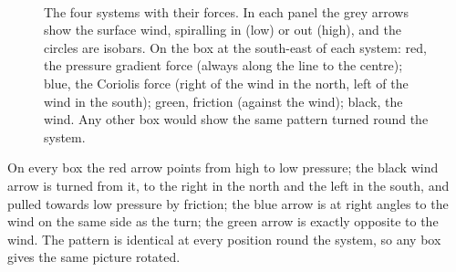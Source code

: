 \begin{figure}[ht]
\centering
\begin{minipage}{0.49\textwidth}\centering
{}
\end{minipage}
\begin{minipage}{0.49\textwidth}\centering
{}
\end{minipage}\\[6pt]
\begin{minipage}{0.49\textwidth}\centering
{}
\end{minipage}
\begin{minipage}{0.49\textwidth}\centering
{}
\end{minipage}
\caption{The four systems with their forces. In each panel the grey arrows show the surface wind, spiralling in (low) or out (high), and the circles are isobars. On the box at the south-east of each system: \textcolor{fred}{red}, the pressure gradient force (always along the line to the centre); \textcolor{fblue}{blue}, the Coriolis force (right of the wind in the north, left of the wind in the south); \textcolor{fgreen!70!black}{green}, friction (against the wind); black, the wind. Any other box would show the same pattern turned round the system.}\label{p3-fig:fig6}
\end{figure}

\begin{answerbox}
On every box the red arrow points from high to low pressure; the black wind arrow is turned from it, to the right in the north and the left in the south, and pulled towards low pressure by friction; the blue arrow is at right angles to the wind on the same side as the turn; the green arrow is exactly opposite to the wind. The pattern is identical at every position round the system, so any box gives the same picture rotated.
\end{answerbox}

